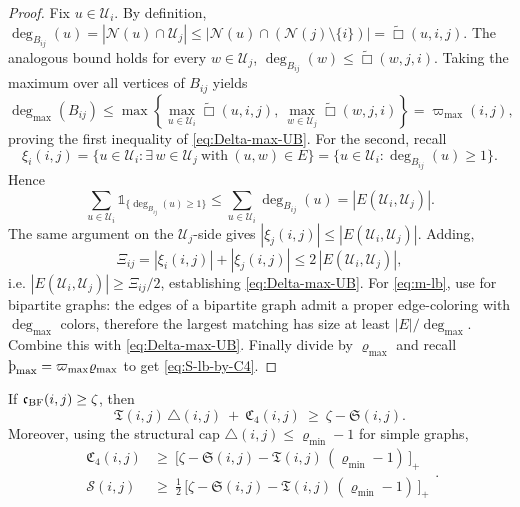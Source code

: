 \documentclass[twoside,11pt]{article}
\numberwithin{equation}{section}
\numberwithin{theorem}{section}
\numberwithin{example}{section}
\newcommand{\sho}{\textup{\text{\th}}}
\begin{document}
\begin{proof}
Fix $u\in\mathcal U_i$. By definition,
\(
\deg_{B_{ij}}(u)=|\mathcal N(u)\cap\mathcal U_j|
 \le |\mathcal N(u)\cap(\mathcal N(j)\setminus\{i\})|
=\widetilde\Box(u,i,j).
\)
The analogous bound holds for every $w\in\mathcal U_j$, $\deg_{B_{ij}}(w)\le \widetilde\Box(w,j,i)$. Taking the maximum over all vertices of $B_{ij}$ yields
\[
\operatorname{deg}_{\max}(B_{ij})
\le 
\max\left\{\max_{u\in\mathcal U_i}\widetilde\Box(u,i,j),\ \max_{w\in\mathcal U_j}\widetilde\Box(w,j,i)\right\}
=\varpi_{\max}(i,j),
\]
proving the first inequality of \eqref{eq:Delta-max-UB}. For the second, recall
\[
\xi_i(i,j)=\{u\in\mathcal U_i:\exists\,w\in\mathcal U_j\ \text{with}\ (u,w)\in E\}=\{u\in\mathcal U_i:\deg_{B_{ij}}(u)\ge 1\}.
\]
Hence 
\[
\sum_{u\in\mathcal U_i}\mathds 1_{\{\deg_{B_{ij}}(u)\ge 1\}}\le \sum_{u\in\mathcal U_i}\deg_{B_{ij}}(u)=|E(\mathcal U_i,\mathcal U_j)|.
\]
The same argument on the $\mathcal U_j$-side gives $|\xi_j(i,j)|\le |E(\mathcal U_i,\mathcal U_j)|$. Adding,
\[
\Xi_{ij}=|\xi_i(i,j)|+|\xi_j(i,j)|\le 2\,|E(\mathcal U_i,\mathcal U_j)|,
\]
i.e. $|E(\mathcal U_i,\mathcal U_j)|\ge \Xi_{ij}/2$, establishing \eqref{eq:Delta-max-UB}. For \eqref{eq:m-lb}, use \citet[Theorem 7.1.7]{west_introduction_2001} for bipartite graphs: the edges of a bipartite graph admit a proper edge-coloring with $\operatorname{deg}_{\max}$ colors, therefore the largest matching has size at least $|E|/\operatorname{deg}_{\max}$. Combine this with \eqref{eq:Delta-max-UB}. Finally divide by $\varrho_{\max}$ and recall $\sho_{\max}=\varpi_{\max}\varrho_{\max}$ to get \eqref{eq:S-lb-by-C4}.
\end{proof}

\begin{lemma}
\label{lem:leftover-rigorous}
If $\mathfrak c_{\rm BF}(i,j)\ge \zeta$, then
\begin{equation}
\label{eq:budget}
\mathfrak T(i,j)\,\triangle(i,j)\ +\ \mathfrak C_4(i,j)\ \ge\ \zeta-\mathfrak S(i,j).
\end{equation}
Moreover, using the structural cap $\triangle(i,j)\le \varrho_{\min}-1$ for simple graphs,
\begin{equation}
\label{eq:C4-leftover-rigorous}
\begin{aligned} 
\mathfrak C_4(i,j)& \ge\ \bigl[\zeta-\mathfrak S(i,j)-\mathfrak T(i,j)\,(\varrho_{\min}-1)\,\bigr]_+
\\
\mathscr S(i,j)& \ge\ \frac12\,\bigl[\zeta-\mathfrak S(i,j)-\mathfrak T(i,j)\,(\varrho_{\min}-1)\,\bigr]_+
\end{aligned}.
\end{equation}
\end{lemma}
\end{document}
